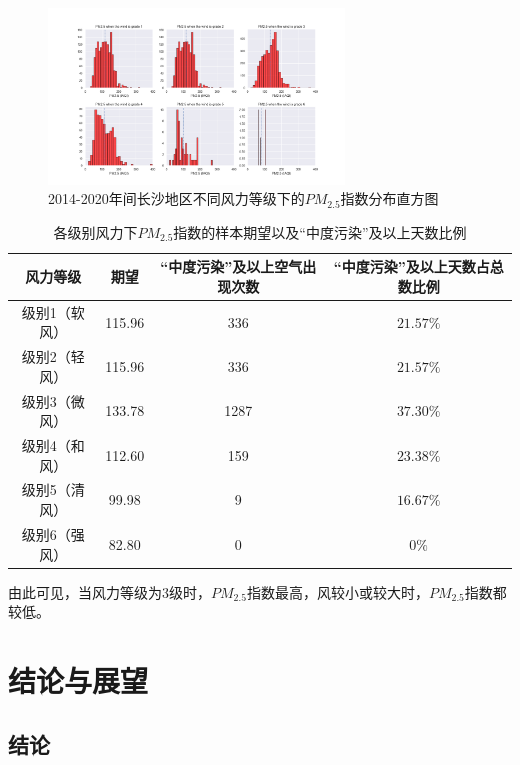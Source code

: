 \documentclass[UTF8,a4paper,10pt]{article}
\begin{document}
\begin{figure}[H] %
\centering %
\includegraphics[width=0.7\textwidth]{..//fig//pm25-wind.png} %
\caption{2014-2020年间长沙地区不同风力等级下的$PM_{2.5}$指数分布直方图} %
\label{Fig.main5} %
\end{figure}

\begin{table}[]
    \caption{各级别风力下$PM_{2.5}$指数的样本期望以及“中度污染”及以上天数比例}
    \vspace{20pt}
    \centering
    \begin{tabular}{cccc}
        \toprule  %
        风力等级& 期望& “中度污染”及以上空气出现次数& “中度污染”及以上天数占总数比例\\
        \midrule  %
        级别1（软风）& 115.96& 336& $21.57\%$\\
        级别2（轻风）& 115.96& 336& $21.57\%$\\
        级别3（微风）& 133.78& 1287& $37.30\%$\\
        级别4（和风）& 112.60& 159& $23.38\%$\\
        级别5（清风）& 99.98& 9& $16.67\%$\\
        级别6（强风）& 82.80& 0& $0\%$\\
        \bottomrule %
    \end{tabular}
    \label{table4}
\end{table}

\indent 由此可见，当风力等级为3级时，$PM_{2.5}$指数最高，风较小或较大时，$PM_{2.5}$指数都较低。

\section{结论与展望}

\subsection{结论}
\end{document}
